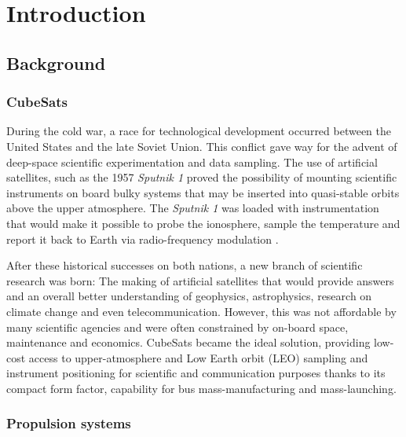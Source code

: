 \pagebreak



\section{Introduction}

\subsection{Background}


\subsubsection{CubeSats}\label{CubeSats}


During the cold war, a race for technological development occurred between the United States and the late Soviet Union. This conflict gave way for the advent of deep-space scientific experimentation and data sampling. The use of artificial satellites, such as the 1957 \textit{Sputnik 1} proved the possibility of mounting scientific instruments on board bulky systems that may be inserted into quasi-stable orbits above the upper atmosphere. The \textit{Sputnik 1} was loaded with instrumentation that would make it possible to probe the ionosphere, sample the temperature and report it back to Earth via radio-frequency modulation \cite{Kuznetsov}.




After these historical successes on both nations, a new branch of scientific research was born: The making of artificial satellites that would provide answers and an overall better understanding of geophysics, astrophysics, research on climate change and even telecommunication. However, this was not affordable by many scientific agencies and were often constrained by on-board space, maintenance and economics. CubeSats became the ideal solution, providing low-cost access to upper-atmosphere and Low Earth orbit (LEO) sampling and instrument positioning for scientific and communication purposes thanks to its compact form factor, capability for bus mass-manufacturing and mass-launching. \cite{ExpCubesat}



\subsubsection{Propulsion systems}

